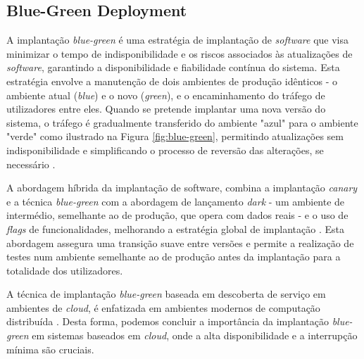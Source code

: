 \subsection{Blue-Green Deployment}

A implantação \textit{blue-green} é uma estratégia de implantação de \textit{software} que visa 
minimizar o tempo de indisponibilidade e os riscos associados às atualizações de \textit{software}, 
garantindo a disponibilidade e fiabilidade contínua do sistema. Esta estratégia envolve a
manutenção de dois ambientes de produção idênticos - o ambiente atual (\textit{blue}) e o novo 
(\textit{green}), e o encaminhamento do tráfego de utilizadores entre eles. Quando se pretende 
implantar uma nova versão do sistema, o tráfego é gradualmente transferido do ambiente "azul" 
para o ambiente "verde" como ilustrado na Figura \ref{fig:blue-green}, permitindo atualizações sem 
indisponibilidade e simplificando o processo de reversão das alterações, se necessário 
\cite{canary2022}.

A abordagem híbrida da implantação de software, combina a implantação \textit{canary} e a técnica 
\textit{blue-green} com a abordagem de lançamento \textit{dark} - um ambiente de intermédio, semelhante
ao de produção, que opera com dados reais - e o uso de \textit{flags} de funcionalidades, 
melhorando a estratégia global de implantação \cite{canary2022}. Esta abordagem assegura uma 
transição suave entre versões e permite a realização de testes num ambiente semelhante ao de 
produção antes da implantação para a totalidade dos utilizadores.

A técnica de implantação \textit{blue-green} baseada em descoberta de serviço em ambientes de 
\textit{cloud}, é enfatizada em ambientes modernos de computação distribuída \cite{bluegreen}. 
Desta forma, podemos concluir a importância da implantação \textit{blue-green} em sistemas baseados 
em \textit{cloud}, onde a alta disponibilidade e a interrupção mínima são cruciais.

